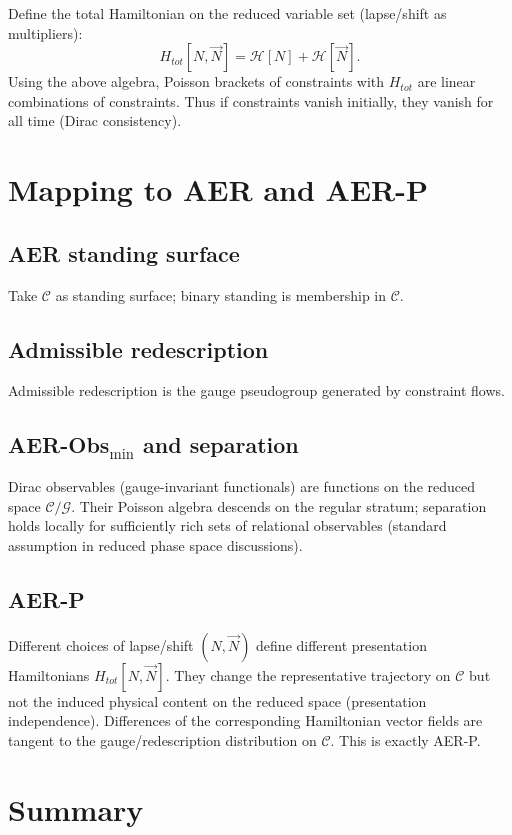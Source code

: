 \documentclass[11pt]{article}
\theoremstyle{remark}
\theoremstyle{plain}
\begin{document}
Define the total Hamiltonian on the reduced variable set (lapse/shift as multipliers):
\begin{equation}
H_{tot}[N,\vec N]=\mathcal{H}[N]+\mathcal{H}[\vec N].
\end{equation}
Using the above algebra, Poisson brackets of constraints with $H_{tot}$ are linear combinations of constraints.
Thus if constraints vanish initially, they vanish for all time (Dirac consistency).

\section{Mapping to AER and AER-P}

\subsection*{AER standing surface}
Take $\mathcal{C}$ as standing surface; binary standing is membership in $\mathcal{C}$.

\subsection*{Admissible redescription}
Admissible redescription is the gauge pseudogroup generated by constraint flows.

\subsection*{AER-Obs$_{\min}$ and separation}
Dirac observables (gauge-invariant functionals) are functions on the reduced space $\mathcal{C}/\mathcal{G}$.
Their Poisson algebra descends on the regular stratum; separation holds locally for sufficiently rich sets of relational observables (standard assumption in reduced phase space discussions).

\subsection*{AER-P}
Different choices of lapse/shift $(N,\vec N)$ define different presentation Hamiltonians $H_{tot}[N,\vec N]$.
They change the representative trajectory on $\mathcal{C}$ but not the induced physical content on the reduced space (presentation independence).
Differences of the corresponding Hamiltonian vector fields are tangent to the gauge/redescription distribution on $\mathcal{C}$.
This is exactly AER-P.

\section{Summary}
\end{document}
